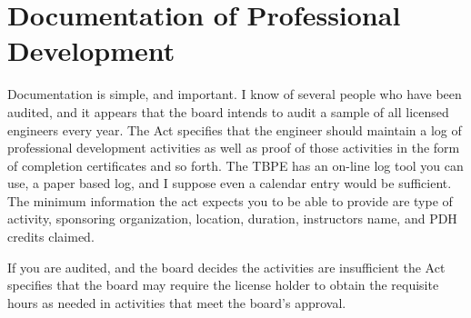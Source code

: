 \section*{Documentation of Professional Development}
Documentation is simple, and important.  I know of several people who have been audited, and it appears that the board intends to audit a sample of all licensed engineers every year.    The Act specifies that the engineer should maintain a log of professional development activities as well as proof of those activities in the form of completion certificates and so forth.  The TBPE has an on-line log tool you can use, a paper based log, and I suppose even a calendar entry would be sufficient.  The minimum information the act expects you to be able to provide are type of activity, sponsoring organization, location, duration, instructors name, and PDH credits claimed.  

If you are audited, and the board decides the activities are insufficient the Act specifies that the board may require the license holder to obtain the requisite hours as needed in activities that meet the board's approval.